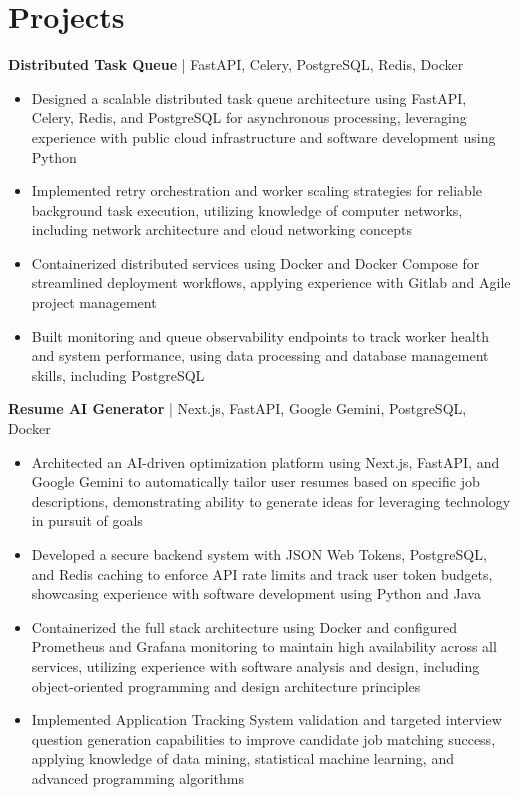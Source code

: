 \section*{Projects}
\textbf{Distributed Task Queue} | FastAPI, Celery, PostgreSQL, Redis, Docker \\
\begin{itemize}
 \item Designed a scalable distributed task queue architecture using FastAPI, Celery, Redis, and PostgreSQL for asynchronous processing, leveraging experience with public cloud infrastructure and software development using Python
 \item Implemented retry orchestration and worker scaling strategies for reliable background task execution, utilizing knowledge of computer networks, including network architecture and cloud networking concepts
 \item Containerized distributed services using Docker and Docker Compose for streamlined deployment workflows, applying experience with Gitlab and Agile project management
 \item Built monitoring and queue observability endpoints to track worker health and system performance, using data processing and database management skills, including PostgreSQL
\end{itemize}

\textbf{Resume AI Generator} | Next.js, FastAPI, Google Gemini, PostgreSQL, Docker \\
\begin{itemize}
  \item Architected an AI-driven optimization platform using Next.js, FastAPI, and Google Gemini to automatically tailor user resumes based on specific job descriptions, demonstrating ability to generate ideas for leveraging technology in pursuit of goals
  \item Developed a secure backend system with JSON Web Tokens, PostgreSQL, and Redis caching to enforce API rate limits and track user token budgets, showcasing experience with software development using Python and Java
  \item Containerized the full stack architecture using Docker and configured Prometheus and Grafana monitoring to maintain high availability across all services, utilizing experience with software analysis and design, including object-oriented programming and design architecture principles
  \item Implemented Application Tracking System validation and targeted interview question generation capabilities to improve candidate job matching success, applying knowledge of data mining, statistical machine learning, and advanced programming algorithms
\end{itemize}

